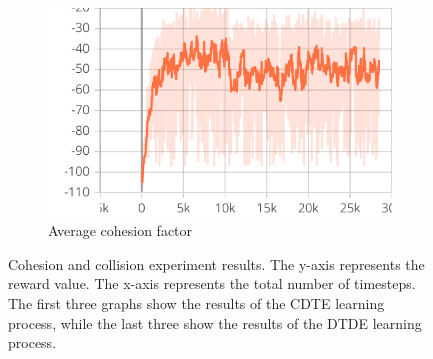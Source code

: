\documentclass[12pt,a4paper,openright,twoside]{book}
\begin{document}
\begin{figure}[t]
\begin{subfigure}[b]{0.32\textwidth}
            \includegraphics[width=\textwidth]{figures/cohesion-dtde.pdf}
            \caption{Average cohesion factor}
            \label{fig:cohesion-dcc}
        \end{subfigure}
    \caption{Cohesion and collision experiment results. The y-axis represents the reward value.
    The x-axis represents the total number of timesteps.
    The first three graphs show the results of the CDTE learning process, while the last three show the results of the DTDE learning process.}
    \label{fig:cc-results}
    \end{figure}
    
\end{document}

